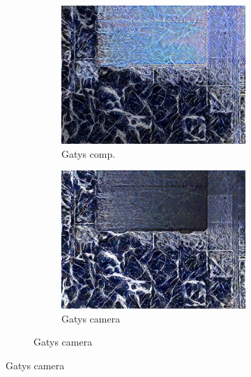 \begin{figure}[]
\begin{subfigure}{\textwidth}
\begin{subfigure}{0.24\textwidth}
        \end{subfigure}
        \hfill
        \begin{subfigure}{0.24\textwidth}
            \centering
            \includegraphics[width=\textwidth]{images/04-experiment02/carpet/marble/gatys_im.jpg}
            \caption*{Gatys comp.}
        \end{subfigure}
        \hfill
        \begin{subfigure}{0.24\textwidth}
            \centering
            \includegraphics[width=\textwidth]{images/04-experiment02/carpet/marble/gatys_proj.jpg}
            \caption*{Gatys camera}
        \end{subfigure}
        

\end{subfigure}
\end{figure}
